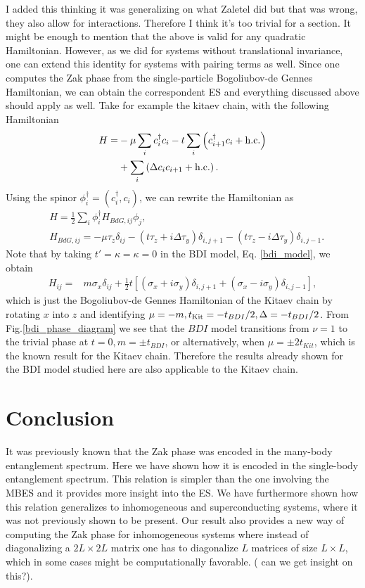\documentclass[twocolumn,amsmath,longbibliography,amssymb,superscriptaddress]{revtex4-1}
\newcommand{\carlos}[1]{{\color{red} #1}}
\begin{document}
\carlos{I added this thinking it was generalizing on what Zaletel did but that was wrong, they also allow for interactions. Therefore I think it's too trivial for a section. It might be enough to mention that the above is valid for any quadratic Hamiltonian.}
However, as we did for systems without translational invariance, one can extend this identity for systems with pairing terms as well. Since one computes the Zak phase from the single-particle Bogoliubov-de Gennes Hamiltonian, we can obtain the correspondent ES and everything discussed above should apply as well. Take for example the kitaev chain, with the following Hamiltonian
\begin{align*}
H =& -\mu \sum_{i} c_i^\dagger c_i - t \sum_{i}\left( c_{i+1}^\dagger c_i + {\rm h.c.}\right) \\
&+  \sum_{i}\left( \Delta c_{i} c_{i+1} + {\rm h.c.}\right).
\end{align*}
Using the spinor $\phi_i^\dagger = (c_i^\dagger, c_i)$, we can rewrite the Hamiltonian as
\begin{align*}
&H = \frac{1}{2}\sum_i \phi^\dagger_i H_{BdG,ij} \phi_j,\\
&H_{BdG,ij} = -\mu \tau_z \delta_{ij} - (t \tau_z + i\Delta \tau_y )\delta_{i,j+1}- (t \tau_z - i\Delta \tau_y)\delta_{i,j-1}.
\end{align*}
Note that by taking $t' = \kappa = \kappa = 0$ in the BDI model, Eq. \ref{bdi_model}, we obtain
\begin{align*}
H_{ij} =& m \sigma_x\delta_{ij} + \frac{1}{2} t \left[(\sigma_x + i \sigma_y)\delta_{i,j+1} + (\sigma_x - i \sigma_y) \delta_{i,j-1} \right],
\end{align*}
which is just the Bogoliubov-de Gennes Hamiltonian of the Kitaev chain by rotating $x$ into $z$ and identifying $\mu = -m, t_{\rm Kit} = -t_{BDI}/2, \Delta = -t_{BDI}/2 $. From Fig.\ref{bdi_phase_diagram} we see that the $BDI$ model transitions from $\nu = 1$ to the trivial phase at $t=0, m=\pm t_{BDI}$, or alternatively, when $\mu = \pm 2 t_{Kit}$, which is the known result for the Kitaev chain. Therefore the results already shown for the BDI model studied here are also applicable to the Kitaev chain.  

\section{Conclusion}

It was previously known that the Zak phase was encoded in the many-body entanglement spectrum. Here we have shown how it is encoded in the single-body entanglement spectrum. This relation is simpler than the one involving the MBES and it provides more insight into the ES. We have furthermore shown how this relation generalizes to inhomogeneous and superconducting systems, where it was not previously shown to be present. Our result also provides a new way of computing the Zak phase for inhomogeneous systems where instead of diagonalizing a $2L\times 2L$ matrix one has to diagonalize $L$ matrices of size $L\times L$, which in some cases might be computationally favorable. (\carlos{can we get insight on this?}). 
\end{document}
